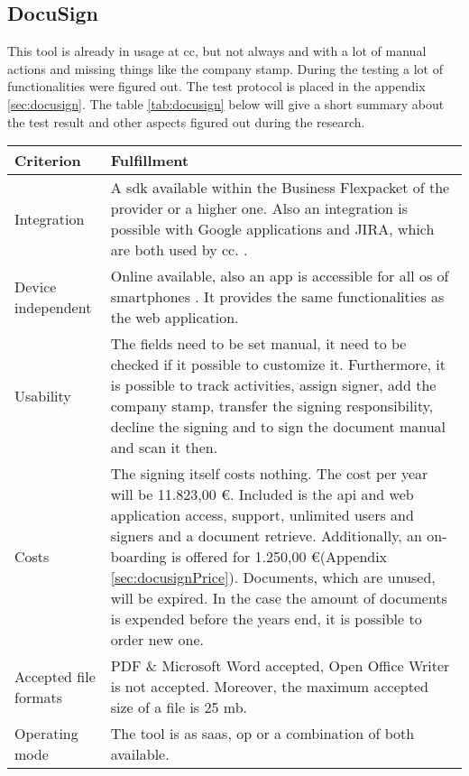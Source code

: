 \subsection{DocuSign}
This tool is already in usage at \gls{cc}, but not always and with a lot of manual actions and missing things like the company stamp. During the testing a lot of functionalities were figured out. The test protocol is placed in the appendix \ref{sec:docusign}. The table \ref{tab:docusign} below will give a short summary about the test result and other aspects figured out during the research.

	
	\begin{longtable}{|p{4cm}|p{10cm}|} \hline
		Criterion & Fulfillment \\ \hline
		Integration &  A \gls{sdk} available within the \grqq Business Flex\grqq packet of the provider or a higher one. Also an integration is possible with Google applications and JIRA, which are both used by \gls{cc}. \parencite{docusign2018integration,docusign2018formats,docusign2018google,docusign2018jira}. \\ \hline
		Device independent & Online available, also an \gls{app} is accessible for all \gls{os} of smartphones \parencite{docusign2018mobile}. It provides the same functionalities as the web application. \\ \hline
		Usability &  The fields need to be set manual, it need to be checked if it possible to customize it. Furthermore, it is possible to track activities, assign signer, add the company stamp, transfer the signing responsibility, decline the signing and to sign the document manual and scan it then. \\ \hline
		Costs & The signing itself costs nothing. The cost per year will be 11.823,00 \euro. Included is the \gls{api} and web application access, support, unlimited users and signers and a document retrieve. Additionally, an on-boarding is offered for 1.250,00 \euro (Appendix \ref{sec:docusignPrice}). Documents, which are unused, will be expired. In the case the amount of documents is expended before the years end, it is possible to order new one. \\ \hline
		Accepted file formats & PDF \& Microsoft Word accepted, Open Office Writer is not accepted. Moreover, the maximum accepted size of a file is 25 \gls{mb}. \parencite{docusign2018formats}\\ \hline
		Operating mode & The tool is as \gls{saas}, \gls{op} or a combination of both available. \parencite{docusign2018op,docusign2018saas} \\ \hline

\end{longtable}
